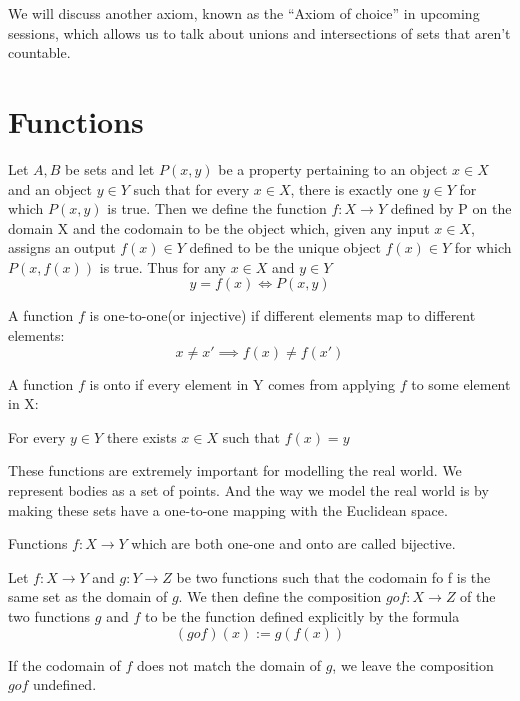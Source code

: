 \documentclass[11pt]{report}
\begin{document}
We will discuss another axiom, known as the ``Axiom of choice'' in upcoming sessions, which allows us to talk about unions and intersections of sets that aren't countable.
\section{Functions}

\begin{definition}[Functions]
	Let $A,B$ be sets and let $P(x,y)$ be a property pertaining to an object $x \in X$ and an object $y \in Y$ such that for every $x \in X$, there is exactly one $y \in Y$ for which $P(x,y)$ is true. Then we define the function $f:X  \rightarrow Y$ defined by P on the domain X and the codomain to be the object which, given any input $x \in X$, assigns an output $f(x) \in Y$ defined to be the unique object $f(x) \in Y$ for which $P(x, f(x))$ is true. Thus for any $x \in X$ and $y \in Y$
	\[
		y = f(x) \Leftrightarrow P(x,y)
	\]
\end{definition}

\begin{definition}
	A function $f$ is one-to-one(or injective) if different elements map to different elements:
	\[
		x \ne x' \implies f(x) \ne f(x')
	\]
\end{definition}
\begin{definition}
	A function $f$ is onto if every element in Y comes from applying $f$ to some element in X:

	For every $y \in Y$ there exists $x \in X$ such that $f(x) = y$
\end{definition}
These functions are extremely important for modelling the real world. We represent bodies as a set of points. And the way we model the real world is by making these sets have a one-to-one mapping with the Euclidean space.
\begin{definition}
	Functions $f: X \rightarrow Y$ which are both one-one and onto are called bijective.
\end{definition}

\begin{definition}
	Let $f: X \rightarrow Y$ and $g: Y \rightarrow Z$ be two functions such that the codomain fo f is the same set as the domain of $g$. We then define the composition $g o f: X \rightarrow Z$ of the two functions $g$ and $f$ to be the function defined explicitly by the formula
	\[
		(g o f)(x) := g(f(x))
	\]

	If the codomain of $f$ does not match the domain of $g$, we leave the composition $g o f$ undefined.
\end{definition}
\end{document}
